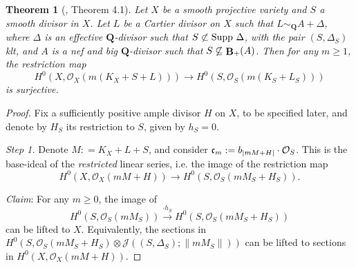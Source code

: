 \documentclass[11pt]{amsart}
\theoremstyle{plain}
\newtheorem{theorem}{Theorem}[section]
\theoremstyle{definition}
\newcommand{\QQ}{\mathbf{Q}}
\newcommand{\OO}{\mathcal  {O}}
\newcommand{\JJ}{\mathcal  {J}}
\newcommand{\frc}{\frak{c}}
\DeclareMathOperator{\BB}{{\bf B}}
\begin{document}
\begin{theorem}[\cite{takayama}, Theorem 4.1]\label{takayama}
Let $X$ be a smooth projective variety and $S$ a smooth divisor in $X$. Let $L$ be a Cartier divisor on $X$ such that  $L \sim_{\QQ}  A + \Delta$, where $\Delta$ is an effective $\QQ$-divisor such that $S \not\subset {\rm Supp}~\Delta$, with the pair $(S, \Delta_S)$ klt, and $A$ is a nef and big $\QQ$-divisor such that $S \not\subseteq \BB_{+} (A)$. Then for any $m\ge 1$, the restriction map 
$$H^0 (X, \OO_X (m (K_X + S + L))) \longrightarrow H^0(S, \OO_S (m(K_S + L_S)))$$ 
is surjective. 
\end{theorem}
\begin{proof}
Fix a sufficiently positive ample divisor $H$ on $X$, to be specified later, and denote by $H_S$ its restriction to $S$, given by $h_S = 0$. 

\noindent
\emph{Step 1.} Denote $M: = K_X + L + S$, and consider $\frc_m : = b_{|mM + H|}\cdot \OO_S$. This is the base-ideal of the \emph{restricted} linear series, i.e. the image of the restriction map
$$H^0 (X, \OO_X (mM + H)) \longrightarrow H^0 (S, \OO_S (mM_S + H_S)).$$

\noindent
\emph{Claim}: For any $m\ge 0$, the image of 
$$H^0 (S, \OO_S(mM_S)) \overset{\cdot h_S}{\longrightarrow} H^0 (S, \OO_S(mM_S + H_S))$$
can be lifted to $X$.  Equivalently, the sections in  
$H^0 (S, \OO_S(mM_S+ H_S)\otimes \JJ((S, \Delta_S); \parallel mM_S \parallel))$
can be lifted to sections in $H^0 (X, \OO_X(mM+ H))$.


\end{proof}
\end{document}
